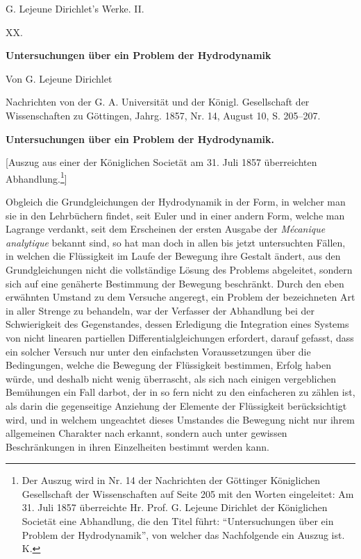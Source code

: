 \documentclass[11pt]{article}
\begin{document}
\begin{center}
{\Large G. Lejeune Dirichlet's Werke. II.}\par\vspace{1.2em}
{\Large XX.}\par\vspace{0.5em}
{\LARGE \textbf{Untersuchungen über ein Problem der Hydrodynamik}}\par\vspace{1em}
{\large Von G. Lejeune Dirichlet}\par\vspace{0.5em}
{\small Nachrichten von der G. A. Universität und der Königl. Gesellschaft der Wissenschaften zu Göttingen, Jahrg. 1857, Nr. 14, August 10, S. 205--207.}
\end{center}

\bigskip
\begin{center}
{\large \textbf{Untersuchungen über ein Problem der Hydrodynamik.}}
\end{center}

\begin{center}
[Auszug aus einer der Königlichen Societät am 31. Juli 1857 überreichten Abhandlung.\footnote{Der Auszug wird in Nr. 14 der Nachrichten der Göttinger Königlichen Gesellschaft der Wissenschaften auf Seite 205 mit den Worten eingeleitet: Am 31. Juli 1857 überreichte Hr. Prof. G. Lejeune Dirichlet der Königlichen Societät eine Abhandlung, die den Titel führt: ``Untersuchungen über ein Problem der Hydrodynamik'', von welcher das Nachfolgende ein Auszug ist. K.}]
\end{center}

Obgleich die Grundgleichungen der Hydrodynamik in der Form, in welcher man sie in den Lehrbüchern findet, seit Euler und in einer andern Form, welche man Lagrange verdankt, seit dem Erscheinen der ersten Ausgabe der \emph{Mécanique analytique} bekannt sind, so hat man doch in allen bis jetzt untersuchten Fällen, in welchen die Flüssigkeit im Laufe der Bewegung ihre Gestalt ändert, aus den Grundgleichungen nicht die vollständige Lösung des Problems abgeleitet, sondern sich auf eine genäherte Bestimmung der Bewegung beschränkt. Durch den eben erwähnten Umstand zu dem Versuche angeregt, ein Problem der bezeichneten Art in aller Strenge zu behandeln, war der Verfasser der Abhandlung bei der Schwierigkeit des Gegenstandes, dessen Erledigung die Integration eines Systems von nicht linearen partiellen Differentialgleichungen erfordert, darauf gefasst, dass ein solcher Versuch nur unter den einfachsten Voraussetzungen über die Bedingungen, welche die Bewegung der Flüssigkeit bestimmen, Erfolg haben würde, und deshalb nicht wenig überrascht, als sich nach einigen vergeblichen Bemühungen ein Fall darbot, der in so fern nicht zu den einfacheren zu zählen ist, als darin die gegenseitige Anziehung der Elemente der Flüssigkeit berücksichtigt wird, und in welchem ungeachtet dieses Umstandes die Bewegung nicht nur ihrem allgemeinen Charakter nach erkannt, sondern auch unter gewissen Beschränkungen in ihren Einzelheiten bestimmt werden kann.
\end{document}
